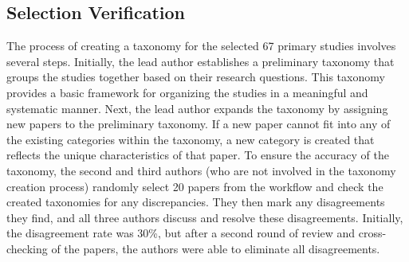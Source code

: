 {%

\subsection{Selection Verification}
\label{sec:sverification}
The process of creating a taxonomy for the selected 67 primary studies involves several steps. Initially, the lead author establishes a preliminary taxonomy that groups the studies together based on their research questions. This taxonomy provides a basic framework for organizing the studies in a meaningful and systematic manner. Next, the lead author expands the taxonomy by assigning new papers to the preliminary taxonomy. If a new paper cannot fit into any of the existing categories within the taxonomy, a new category is created that reflects the unique characteristics of that paper. To ensure the accuracy of the taxonomy, the second and third authors (who are not involved in the taxonomy creation process) randomly select 20 papers from the workflow and check the created taxonomies for any discrepancies. They then mark any disagreements they find, and all three authors discuss and resolve these disagreements. Initially, the disagreement rate was 30\%, but after a second round of review and cross-checking of the papers, the authors were able to eliminate all disagreements.


}
